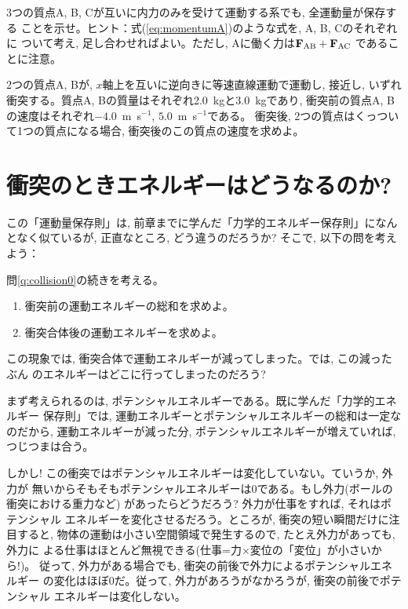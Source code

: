 %
\begin{q}\label{q:3body_momentum}
3つの質点A, B, Cが互いに内力のみを受けて運動する系でも, 全運動量が保存する
ことを示せ。ヒント：式(\ref{eq:momentumA})のような式を, A, B, Cのそれぞれに
ついて考え, 足し合わせればよい。ただし, Aに働く力は${\bf F}_{\text {AB}}+{\bf F}_{\text {AC}}$
であることに注意。
\end{q}

\begin{q} 2つの質点A, Bが, $x$軸上を互いに逆向きに等速直線運動で運動し, 接近し, 
いずれ衝突する。質点A, Bの質量はそれぞれ2.0~kgと3.0~kgであり, 
衝突前の質点A, Bの速度はそれぞれ$-4.0$~m~s$^{-1}$, $5.0$~m~s$^{-1}$である。
衝突後, 2つの質点はくっついて1つの質点になる場合, 衝突後のこの質点の速度を求めよ。\end{q}
\hv


\section{衝突のときエネルギーはどうなるのか?}

この「運動量保存則」は, 前章までに学んだ「力学的エネルギー保存則」になんとなく似ているが, 
正直なところ, どう違うのだろうか? そこで, 以下の問を考えよう：

%
\begin{q}\label{q:collision1}
問\ref{q:collision0}の続きを考える。
\begin{enumerate}
\item 衝突前の運動エネルギーの総和を求めよ。
\item 衝突合体後の運動エネルギーを求めよ。
\end{enumerate}
\end{q}

この現象では, 衝突合体で運動エネルギーが減ってしまった。では, この減ったぶん
のエネルギーはどこに行ってしまったのだろう?

まず考えられるのは, ポテンシャルエネルギーである。既に学んだ「力学的エネルギー
保存則」では, 運動エネルギーとポテンシャルエネルギーの総和は一定なのだから, 
運動エネルギーが減った分, ポテンシャルエネルギーが増えていれば, つじつまは合う。

しかし! この衝突ではポテンシャルエネルギーは変化していない。ていうか, 外力が
無いからそもそもポテンシャルエネルギーは0である。もし外力(ボールの衝突における重力など)
があったらどうだろう? 外力が仕事をすれば, それはポテンシャル
エネルギーを変化させるだろう。ところが, 衝突の短い瞬間だけに注目すると, 
物体の運動は小さい空間領域で発生するので, たとえ外力があっても, 外力に
よる仕事はほとんど無視できる(仕事=力$\times$変位の「変位」が小さいから!)。
従って, 外力がある場合でも, 衝突の前後で外力によるポテンシャルエネルギー
の変化はほぼ0だ。従って, 外力があろうがなかろうが, 衝突の前後でポテンシャル
エネルギーは変化しない。

